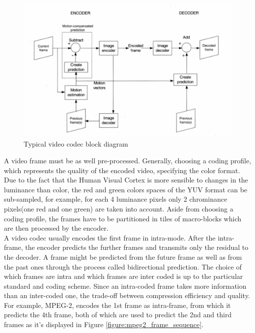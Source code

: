 \documentclass[a4paper,11pt,oneside]{article}
\begin{document}
\begin{figure}[h]
  \centering
  \includegraphics[width=\textwidth]{../figures/f1_codec_block_diagram.pdf}
  \caption{Typical video codec block diagram\cite[pp.~44]{richardson2002video}}
  \label{figure:codec_block_diagram}
\end{figure} 
\clearpage
\indent A video frame must be as well pre-processed. Generally, choosing a coding profile, which represents the quality of the encoded video, specifying the color format. Due to the fact that the Human Visual Cortex is more sensible to changes in the luminance than color, the red and green colors spaces of the YUV format can be sub-sampled, for example, for each 4 luminance pixels only 2 chrominance pixels(one red and one green) are taken into account. Aside from choosing  a coding profile, the frames have to be partitioned in tiles of macro-blocks which are then processed by the encoder. \\
\indent A video codec usually encodes the first frame in intra-mode. After the intra-frame, the encoder predicts the further frames and transmits only the residual to the decoder. A frame might be predicted from the future frame as well as from the past ones through the process called bidirectional prediction. The choice of which frames are intra and which frames are inter coded is up to the particular standard and coding scheme. Since an intra-coded frame takes more information than an inter-coded one, the trade-off between compression efficiency and quality. For example, MPEG-2, encodes the 1st frame as intra-frame, from which it predicts the 4th frame, both of which are used to predict the 2nd and third frames as it's displayed in Figure \ref{figure:mpeg2_frame_sequence}. \\ 
\end{document}

